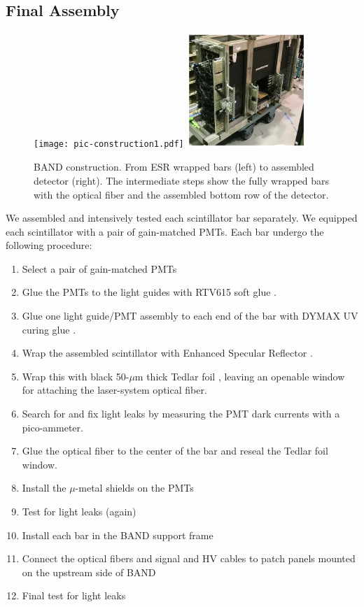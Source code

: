 \documentclass[3p,final,twocolumn]{elsarticle}
\begin{document}
\subsection{Final Assembly}
\label{sec:assembly}
\begin{figure}[tb]
	\centering
	\texttt{[image: pic-construction1.pdf]}
	\includegraphics[width=0.40\textwidth , height=0.40\textwidth]{pic-construction2.pdf}
				\caption{BAND construction. From ESR \cite{3MESR} wrapped bars (left) to assembled detector (right). The intermediate steps show the fully wrapped bars with the optical fiber and the assembled bottom row of the detector.}
		\label{fig:barassembly}
\end{figure}
We assembled and intensively tested each scintillator bar
separately. We equipped each scintillator with a pair of gain-matched
PMTs.  Each bar undergo the following procedure:
\begin{enumerate}
\item Select a pair of gain-matched PMTs
\item Glue the PMTs to the light guides with RTV615 soft glue \cite{softglue}.
\item Glue one light guide/PMT assembly to each end of the bar with DYMAX
  UV curing glue \cite{uvglue}.
\item Wrap the assembled scintillator with Enhanced Specular Reflector \cite{3MESR}.
\item Wrap this with black 50-$\mu$m thick Tedlar foil \cite{tedlarfoil}, leaving an openable
  window for attaching the laser-system optical fiber.
\item Search for and fix light leaks by measuring the PMT dark currents with a pico-ammeter.
\item Glue the optical fiber to the center of the bar and reseal the Tedlar foil window.
\item Install the $\mu$-metal shields on the PMTs 
\item Test for light leaks (again)
\item Install each bar in the BAND support frame
\item Connect the optical fibers and signal and HV cables to patch panels mounted on the upstream side of BAND
\item Final test for light leaks
\end{enumerate}
\end{document}
